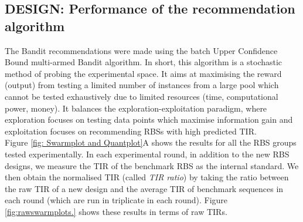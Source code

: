 \documentclass{article}
\begin{document}
\subsection{DESIGN: Performance of the recommendation algorithm}
\label{sec:ucb-results}


The Bandit recommendations were made using the batch Upper Confidence Bound multi-armed Bandit algorithm.
In short, this algorithm is a stochastic method of probing the experimental space. 
It aims at maximising the reward (output) from testing a limited number of instances from a large pool which cannot be tested exhaustively due to limited resources (time, computational power, money).
It balances the exploration-exploitation paradigm, where exploration focuses on testing data points which maximise information gain and exploitation focuses on recommending RBSs with high predicted TIR.\\

Figure \ref{fig: Swarmplot and Quantplot}A shows the results for all the RBS groups tested experimentally.
In each experimental round, in addition to the new RBS designs, we measure the TIR of the benchmark RBS as the internal standard.
We then obtain the normalised TIR (called \textit{TIR ratio}) by taking the ratio between the raw TIR of a new design and the average TIR of benchmark sequences in each round (which are run in triplicate in each round).
Figure \ref{fig:rawswarmplots.} shows these results in terms of raw TIRs.\\
\end{document}
